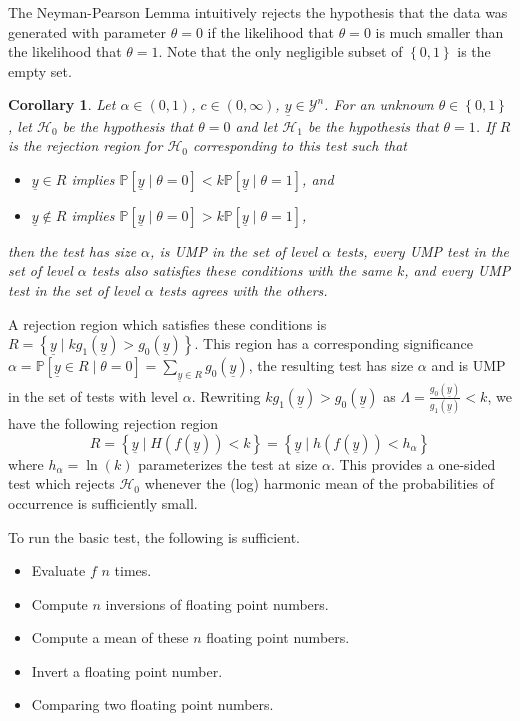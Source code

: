 \documentclass{tran-l}
\theoremstyle{cor}
\newtheorem{cor}[theorem]{Corollary}
\theoremstyle{definition}
\theoremstyle{remark}
\theoremstyle{conjecture}
\numberwithin{equation}{section}
\begin{document}
The Neyman-Pearson Lemma intuitively rejects the hypothesis that the data was generated with parameter $\theta = 0$ if the likelihood that $\theta = 0$ is much smaller than the likelihood that $\theta = 1$.
Note that the only negligible subset of $\left\{0,1\right\}$ is the empty set.


\begin{cor}
Let $\alpha \in (0, 1)$, $c \in (0, \infty)$, $\underline{y} \in \mathcal{Y}^n$. For an unknown $\theta \in \left\{0,1\right\}$, let $\mathcal{H}_0$ be the hypothesis that $\theta = 0$ and let $\mathcal{H}_1$ be the hypothesis that $\theta = 1$. If $R$ is the rejection region for $\mathcal{H}_0$ corresponding to this test such that
\begin{itemize}
\item $\underline{y} \in R$ implies $\mathbb{P}[\underline{y} \mid \theta = 0] < k\mathbb{P}[\underline{y} \mid \theta = 1]$, and
\item $\underline{y} \notin R$ implies $\mathbb{P}[\underline{y} \mid \theta = 0] > k\mathbb{P}[\underline{y} \mid \theta = 1]$,
\end{itemize} then the test has size $\alpha$, is UMP in the set of level $\alpha$ tests, every UMP test in the set of level $\alpha$ tests also satisfies these conditions with the same $k$, and every UMP test in the set of level $\alpha$ tests  agrees with the others.
\end{cor}

A rejection region which satisfies these conditions is $R = \left\{\underline{y} \mid kg_1(\underline{y}) > g_0(\underline{y})\right\}$.
This region has a corresponding significance $\alpha = \mathbb{P}\left[\underline{y} \in R \mid \theta = 0\right] = \sum_{\underline{y} \in R} g_0(\underline{y})$, the resulting test has size $\alpha$ and is UMP in the set of tests with level $\alpha$.
Rewriting $kg_1(\underline{y}) > g_0(\underline{y})$ as $\Lambda = \frac{g_0(\underline{y})}{g_1(\underline{y})} < k$, we have the following rejection region
\[R = \left\{\underline{y} \mid H(f(\underline{y})) < k\right\} = \left\{\underline{y} \mid h(f(\underline{y})) < h_\alpha\right\}\]
where $h_\alpha = \ln(k)$ parameterizes the test at size $\alpha$.
This provides a one-sided test which rejects $\mathcal{H}_0$ whenever the (log) harmonic mean of the probabilities of occurrence is sufficiently small.

To run the basic test, the following is sufficient.
\begin{itemize}
\item Evaluate $f$ $n$ times.
\item Compute $n$ inversions of floating point numbers.
\item Compute a mean of these $n$ floating point numbers.
\item Invert a floating point number.
\item Comparing two floating point numbers.
\end{itemize}
\end{document}
